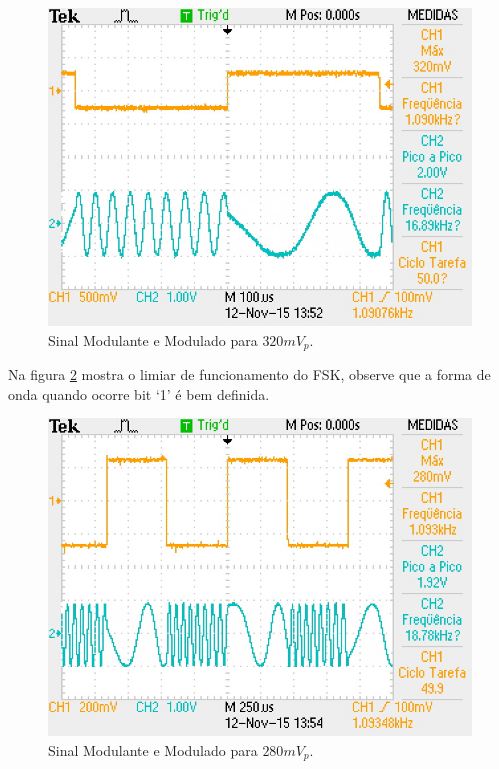 \documentclass[12pt,a4paper]{article}%
\begin{document}
\begin{figure}[H]
\centering
\includegraphics[scale=0.5]{imagem/TEK0002}
\caption{Sinal Modulante e Modulado para $320 mV_p$.}
\label{fig:02}
\end{figure}

Na figura \ref{fig:03} mostra o limiar de funcionamento do FSK, observe que a forma de onda quando ocorre bit ‘1’ é bem definida.

\begin{figure}[H]
\centering
\includegraphics[scale=0.5]{imagem/TEK0003}
\caption{Sinal Modulante e Modulado para $280 mV_p$.}
\label{fig:03}
\end{figure}
\end{document}
